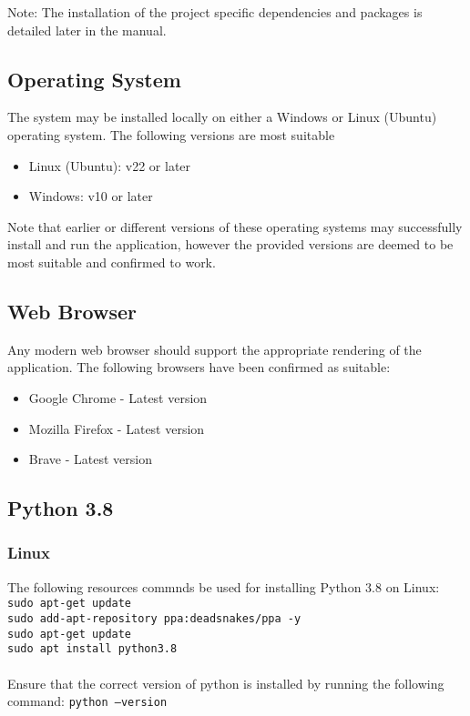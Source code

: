 \documentclass{article}
\newcommand{\code}[1]{\colorbox{light-gray}{\texttt{#1}}}
\begin{document}
Note: The installation of the project specific dependencies and packages is detailed later in the manual.

\subsection{Operating System}
The system may be installed locally on either a Windows or Linux (Ubuntu) operating system. The following versions are most suitable
\begin{itemize}
    \item Linux (Ubuntu): v22 or later
    \item Windows: v10 or later
\end{itemize}
Note that earlier or different versions of these operating systems may successfully install and run the application, however the provided
versions are deemed to be most suitable and confirmed to work.

\subsection{Web Browser}
Any modern web browser should support the appropriate rendering of the application. The following browsers have been confirmed as suitable:
\begin{itemize}
    \item Google Chrome - Latest version
    \item Mozilla Firefox - Latest version
    \item Brave - Latest version
\end{itemize}

\subsection{Python 3.8}
\subsubsection{Linux}
The following resources commnds be used for installing Python 3.8 on Linux:\\
\code{sudo apt-get update}\\
\code{sudo add-apt-repository ppa:deadsnakes/ppa -y}\\
\code{sudo apt-get update}\\
\code{sudo apt install python3.8}\\ \\
Ensure that the correct version of python is installed by running the following command:
\code{python --version}
\end{document}
